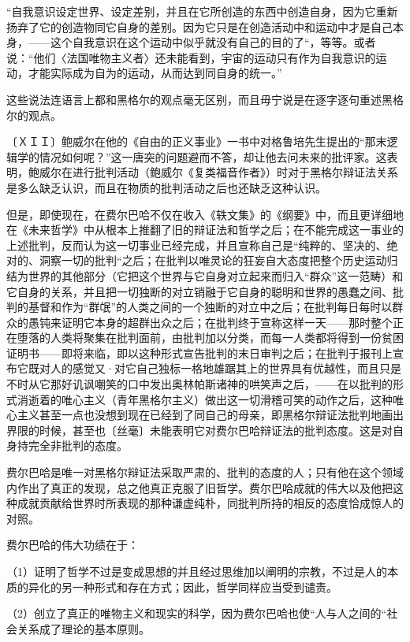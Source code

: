 \documentclass[a4paper,twoside,12pt]{ctexart}
\begin{document}
\begin{fangsong}
“自我意识设定世界、设定差别，并且在它所创造的东西中创造自身，因为它重新扬弃了它的创造物同它自身的差别。因为它只是在创造活动中和运动中才是自己本身，——这个自我意识在这个运动中似乎就没有自己的目的了“，等等。或者说：“他们〈法国唯物主义者〉还未能看到，宇宙的运动只有作为自我意识的运动，才能实际成为自为的运动，从而达到同自身的统一。”    
\end{fangsong}

这些说法连语言上都和黑格尔的观点毫无区别，而且毋宁说是在逐字逐句重述黑格尔的观点。

〔ＸＩＩ〕鲍威尔在他的《自由的正义事业》一书中对格鲁培先生提出的“那末逻辑学的情况如何呢？”这一唐突的问题避而不答，却让他去问未来的批评家。这表明，鲍威尔在进行批判活动（鲍威尔《复类福音作者》）时对于黑格尔辩证法关系是多么缺乏认识，而且在物质的批判活动之后也还缺乏这种认识。

但是，即使现在，在费尔巴哈不仅在收入《轶文集》的《纲要》中，而且更详细地在《未来哲学》中从根本上推翻了旧的辩证法和哲学之后；在不能完成这一事业的上述批判，反而认为这一切事业已经完成，并且宣称自己是“纯粹的、坚决的、绝对的、洞察一切的批判“之后；在批判以唯灵论的狂妄自大态度把整个历史运动归结为世界的其他部分（它把这个世界与它自身对立起来而归入“群众”这一范畴）和它自身的关系，并且把一切独断的对立销融于它自身的聪明和世界的愚蠢之间、批判的基督和作为“群氓”的人类之间的一个独断的对立中之后；在批判每日每时以群众的愚钝来证明它本身的超群出众之后；在批判终于宣称这样一天——那时整个正在堕落的人类将聚集在批判面前，由批判加以分类，而每一人类都将得到一份贫困证明书——即将来临，即以这种形式宣告批判的末日审判之后；在批判于报刊上宣布它既对人的感觉又·对它自己独标一格地雄踞其上的世界具有优越性，而且只是不时从它那好讥讽嘲笑的口中发出奥林帕斯诸神的哄笑声之后，——在以批判的形式消逝着的唯心主义（青年黑格尔主义）做出这一切滑稽可笑的动作之后，这种唯心主义甚至一点也没想到现在已经到了同自己的母亲，即黑格尔辩证法批判地画出界限的时候，甚至也〔丝毫〕未能表明它对费尔巴哈辩证法的批判态度。这是对自身持完全非批判的态度。

费尔巴哈是唯一对黑格尔辩证法采取严肃的、批判的态度的人；只有他在这个领域内作出了真正的发现，总之他真正克服了旧哲学。费尔巴哈成就的伟大以及他把这种成就贡献给世界时所表现的那种谦虚纯朴，同批判所持的相反的态度恰成惊人的对照。

费尔巴哈的伟大功绩在于：

（1）证明了哲学不过是变成思想的并且经过思维加以阐明的宗教，不过是人的本质的异化的另一种形式和存在方式；因此，哲学同样应当受到谴责。

（2）创立了真正的唯物主义和现实的科学，因为费尔巴哈也使“人与人之间的“社会关系成了理论的基本原则。
\end{document}
